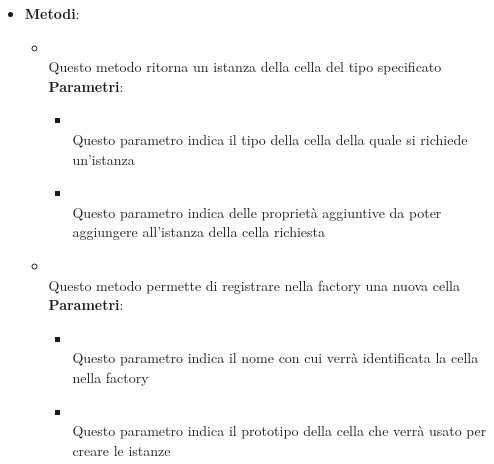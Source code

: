 \begin{itemize}
\begin{itemize}
\end{itemize}
\item \textbf{Metodi}:
\begin{itemize}
\item {}
\\ Questo metodo ritorna un istanza della cella del tipo specificato
\\ \textbf{Parametri}:
\begin{itemize}
\item {}
\\ Questo parametro indica il tipo della cella della quale si richiede un'istanza
\item {}
\\ Questo parametro indica delle proprietà aggiuntive da poter aggiungere all'istanza della cella richiesta
\end{itemize}
\item {}
\\ Questo metodo permette di registrare nella factory una nuova cella
\\ \textbf{Parametri}:
\begin{itemize}
\item {}
\\ Questo parametro indica il nome con cui verrà identificata la cella nella factory
\item {}
\\ Questo parametro indica il prototipo della cella che verrà usato per creare le istanze
\end{itemize}
\end{itemize}
\end{itemize}

